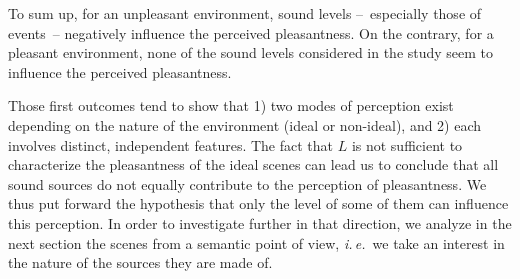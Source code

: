 \documentclass[12pt]{elsarticle}
\newcommand{\ie}{\emph{i.\,e.}}
\begin{document}


To sum up, for an unpleasant environment, sound levels --~especially those of events~-- negatively influence the perceived pleasantness. On the contrary, for a pleasant environment, none of the sound levels considered in the study seem to influence the perceived pleasantness.



Those first outcomes tend to show that 1) two modes of perception exist depending on the nature of the environment (ideal or non-ideal), and 2) each involves distinct, independent features. The fact that $L$ is not sufficient to characterize the pleasantness of the ideal scenes can lead us to conclude that all sound sources do not equally contribute to the perception of pleasantness. We thus put forward the hypothesis that only the level of some of them can influence this perception. In order to investigate further in that direction, we analyze in the next section the scenes from a semantic point of view, \ie~we take an interest in the nature of the sources they are made of.
\end{document}
